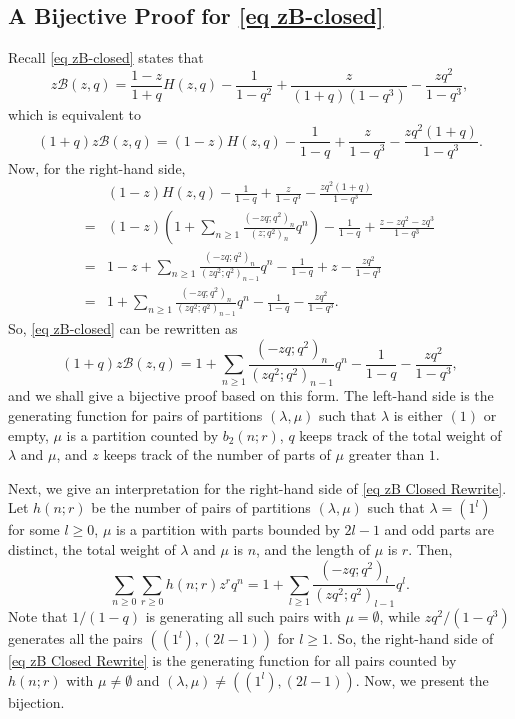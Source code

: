 \documentclass[10pt,a4paper]{amsart}
\numberwithin{equation}{section}
\begin{document}
\subsection{A Bijective Proof for \eqref{eq zB-closed}} Recall \eqref{eq zB-closed} states that
\begin{equation*}
z\mathcal B(z,q)=\frac{1-z}{1+q}H(z,q)-\frac{1}{1-q^2}
+\frac{z}{(1+q)(1-q^3)}-\frac{zq^2}{1-q^3},   
\end{equation*}
which is equivalent to
\begin{equation*}
(1+q)z\mathcal{B}(z,q)=(1-z)H(z,q)-\frac{1}{1-q}+\frac{z}{1-q^3}-\frac{zq^2(1+q)}{1-q^3}.
\end{equation*}
Now, for the right-hand side,
\begin{align*}
&(1-z)H(z,q)-\frac{1}{1-q}+\frac{z}{1-q^3}-\frac{zq^2(1+q)}{1-q^3}\\
=&(1-z)\left(1+\sum_{n\geq1}\frac{(-zq;q^2)_n}{(z;q^2)_n}q^n\right)-\frac{1}{1-q}+\frac{z-zq^2-zq^3}{1-q^3}\\
=&1-z+\sum_{n\geq1}\frac{(-zq;q^2)_n}{(zq^2;q^2)_{n-1}}q^n-\frac{1}{1-q}+z-\frac{zq^2}{1-q^3}\\
=&1+\sum_{n\geq1}\frac{(-zq;q^2)_n}{(zq^2;q^2)_{n-1}}q^n-\frac{1}{1-q}-\frac{zq^2}{1-q^3}.
\end{align*}
So, \eqref{eq zB-closed} can be rewritten as
\begin{equation}\label{eq zB Closed Rewrite}
(1+q)z\mathcal{B}(z,q)=1+\sum_{n\geq1}\frac{(-zq;q^2)_n}{(zq^2;q^2)_{n-1}}q^n-\frac{1}{1-q}-\frac{zq^2}{1-q^3},   
\end{equation}
and we shall give a bijective proof based on this form. The left-hand side is the generating function for pairs of partitions $(\lambda,\mu)$ such that $\lambda$ is either $(1)$ or empty, $\mu$ is a partition counted by $b_2(n;r)$, $q$ keeps track of the total weight of $\lambda$ and $\mu$, and $z$ keeps track of the number of parts of $\mu$ greater than $1$.

Next, we give an interpretation for the right-hand side of \eqref{eq zB Closed Rewrite}. Let $h(n;r)$ be the number of pairs of partitions $(\lambda,\mu)$ such that $\lambda=(1^l)$ for some $l\geq0$, $\mu$ is a partition with parts bounded by $2l-1$ and odd parts are distinct, the total weight of $\lambda$ and $\mu$ is $n$, and the length of $\mu$ is $r$. Then,
$$\sum_{n\geq0}\sum_{r\geq0}h(n;r)z^rq^{n}=1+\sum_{l\geq1}\frac{(-zq;q^2)_l}{(zq^2;q^2)_{l-1}}q^{l}.$$
Note that $1/(1-q)$ is generating all such pairs with $\mu=\emptyset$, while $zq^2/(1-q^3)$ generates all the pairs $((1^l),(2l-1))$ for $l\geq1$. So, the right-hand side of \eqref{eq zB Closed Rewrite} is the generating function for all pairs counted by $h(n;r)$ with $\mu\neq\emptyset$ and $(\lambda,\mu)\neq((1^l),(2l-1))$. Now, we present the bijection.
\end{document}
